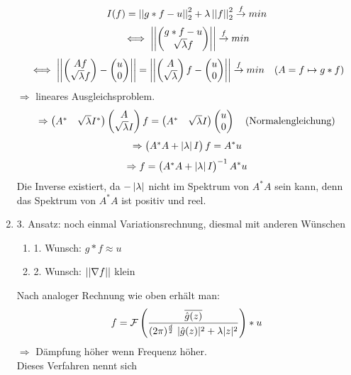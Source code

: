 \begin{enumerate}
        \[I(f) = \left\lvert \left\lvert g*f-u \right\rvert \right\rvert_2^2 + \lambda \left\lvert \left\lvert f \right\rvert \right\rvert_2^2 \overset{f}{\to} min\]
        \[\iff \left\lvert \left\lvert \begin{pmatrix} g*f-u\\ \sqrt{\lambda} f \end{pmatrix} \right\rvert \right\rvert \overset{f}{\to} min\]
        \[\iff \left\lvert \left\lvert \begin{pmatrix} Af \\ \sqrt{\lambda}f \end{pmatrix} - \begin{pmatrix} u\\0 \end{pmatrix} \right\rvert \right\rvert = \left\lvert \left\lvert \begin{pmatrix} A \\ \sqrt{\lambda} \end{pmatrix}f - \begin{pmatrix} u\\0 \end{pmatrix} \right\rvert \right\rvert \overset{f}{\to} min \quad (A= f \mapsto g*f)\]
        $\Rightarrow$ lineares Ausgleichsproblem.
        \[\Rightarrow \begin{pmatrix} A^* &\sqrt{\lambda} I^* \end{pmatrix} \begin{pmatrix} A \\ \sqrt{\lambda}I \end{pmatrix}f = \begin{pmatrix} A^* & \sqrt{\lambda}I \end{pmatrix} \begin{pmatrix} u \\ 0 \end{pmatrix} \quad \text{(Normalengleichung)}\]
        \[\Rightarrow \begin{pmatrix} A^*A + \left\lvert \lambda \right\rvert I \end{pmatrix}f=A^*u\]
        \[\Rightarrow f= \begin{pmatrix} A^*A + \left\lvert \lambda \right\rvert I \end{pmatrix}^{-1}A^*u\]
        Die Inverse existiert, da $-\left\lvert \lambda \right\rvert$ nicht im Spektrum von $A^*A$ sein kann, denn das Spektrum von $A^*A$ ist positiv und reel.
        \item[] 3. Ansatz: noch einmal Variationsrechnung, diesmal mit anderen Wünschen
        \begin{enumerate}
            \item[] 1. Wunsch: $g *f \approx u$
            \item[] 2. Wunsch: $\left\lvert \left\lvert \nabla f \right\rvert \right\rvert$ klein
        \end{enumerate}
        Nach analoger Rechnung wie oben erhält man: 
        \begin{equation}
            f=\mathcal{F} \left( \frac{\overline{\hat g(z)}}{(2\pi)^\frac{d}{2} \ |\hat g(z)|^2 + \lambda |z|^2} \right) * u
        \end{equation}
        $\Rightarrow$ Dämpfung höher wenn Frequenz höher.\\
        Dieses Verfahren nennt sich 
    \end{enumerate}
